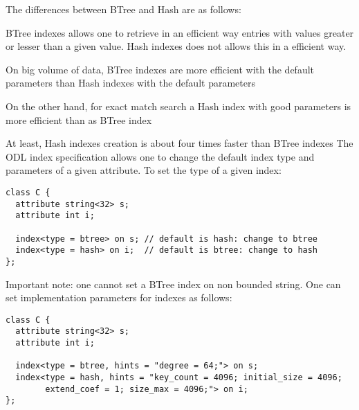 The differences between BTree and Hash are as follows:
\bi
\item BTree indexes allows one to retrieve in an efficient way
entries with values greater or lesser than a given value. Hash indexes
does not allows this in a efficient way.
\item On big volume of data, BTree indexes are more efficient 
with the default parameters than Hash indexes with the default parameters
\item On the other hand, for exact match search a Hash index
with good parameters is more efficient than as BTree index
\item At least, Hash indexes creation is about four times faster
than BTree indexes
\ei
The ODL index specification allows one to change the default index
type and parameters of a given attribute.
To set the type of a given index:
\begin{verbatim}
class C {
  attribute string<32> s;
  attribute int i;

  index<type = btree> on s; // default is hash: change to btree
  index<type = hash> on i;  // default is btree: change to hash
};
\end{verbatim}
Important note: one cannot set a BTree index on non bounded string.
One can set implementation parameters for indexes as follows:
\begin{verbatim}
class C {
  attribute string<32> s;
  attribute int i;

  index<type = btree, hints = "degree = 64;"> on s;
  index<type = hash, hints = "key_count = 4096; initial_size = 4096;
        extend_coef = 1; size_max = 4096;"> on i;
};
\end{verbatim}


